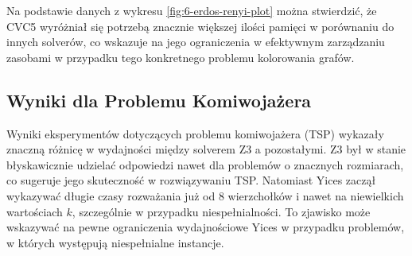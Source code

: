 Na podstawie danych z wykresu \ref{fig:6-erdos-renyi-plot} można stwierdzić, że CVC5 wyróżniał się potrzebą znacznie większej ilości pamięci w porównaniu do innych solverów, co wskazuje na jego ograniczenia w efektywnym zarządzaniu zasobami w przypadku tego konkretnego problemu kolorowania grafów.

\subsection{Wyniki dla Problemu Komiwojażera}

Wyniki eksperymentów dotyczących problemu komiwojażera (TSP) wykazały znaczną różnicę w wydajności między solverem Z3 a pozostałymi. Z3 był w stanie błyskawicznie udzielać odpowiedzi nawet dla problemów o znacznych rozmiarach, co sugeruje jego skuteczność w rozwiązywaniu TSP. Natomiast Yices zaczął wykazywać długie czasy rozważania już od 8 wierzchołków i nawet na niewielkich wartościach $k$, szczególnie w przypadku niespełnialności. To zjawisko może wskazywać na pewne ograniczenia wydajnościowe Yices w przypadku problemów, w których występują niespełnialne instancje.


